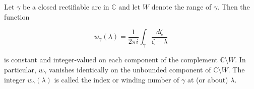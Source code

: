 Let $\gamma$ be a closed rectifiable arc in $\mathbb{C}$ and let $W$ denote the range of $\gamma$. Then the function

$$w_{\gamma}(\lambda) = \frac{1}{2\pi i} \int_{\gamma} \frac{d\zeta}{\zeta - \lambda}$$

is constant and integer-valued on each component of the complement $\mathbb{C} \setminus W$. In particular, $w_{\gamma}$ vanishes identically on the unbounded component of $\mathbb{C} \setminus W$. The integer $w_{\gamma}(\lambda)$ is called the index or winding number of $\gamma$ at (or about) $\lambda$.
